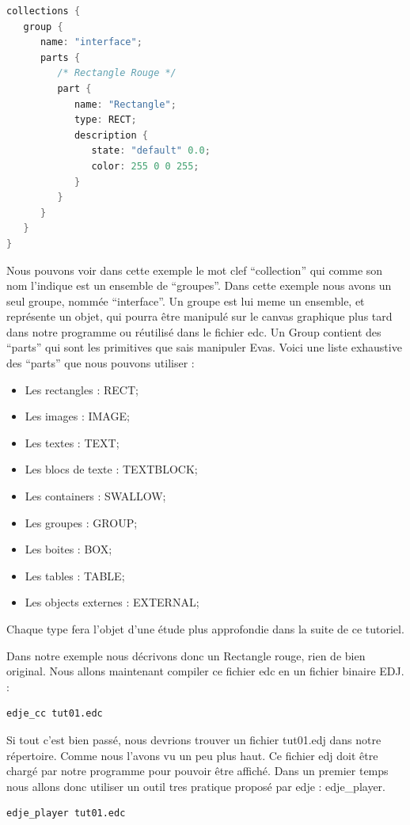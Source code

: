 \documentclass[a4paper]{efr}
\begin{document}
\begin{lstlisting}[language=c]
 collections {
   group {
      name: "interface";
      parts {
         /* Rectangle Rouge */
         part {
            name: "Rectangle";
            type: RECT;
            description {
               state: "default" 0.0;
               color: 255 0 0 255;
            }
         }
      }
   }
}
\end{lstlisting}

Nous pouvons voir dans cette exemple le mot clef ``collection'' qui comme son
nom l'indique est un ensemble de ``groupes''.
Dans cette exemple nous avons un seul groupe, nommée ``interface''.
Un groupe est lui meme un ensemble, et représente un objet, qui pourra être
manipulé sur le canvas graphique plus tard dans notre programme ou réutilisé
dans le fichier edc.
Un Group contient des ``parts'' qui sont les primitives que sais manipuler Evas.
Voici une liste exhaustive des ``parts'' que nous pouvons utiliser :
\begin{itemize}
\item Les rectangles : RECT;
\item Les images : IMAGE;
\item Les textes : TEXT;
\item Les blocs de texte : TEXTBLOCK;
\item Les containers : SWALLOW;
\item Les groupes : GROUP;
\item Les boites : BOX;
\item Les tables : TABLE;
\item Les objects externes : EXTERNAL;
\end{itemize}
Chaque type fera l'objet d'une étude plus approfondie dans la suite de ce
tutoriel.

Dans notre exemple nous décrivons donc un Rectangle rouge, rien de bien
original. Nous allons maintenant compiler ce fichier edc en un fichier binaire
EDJ.  :

\begin{lstlisting}
edje_cc tut01.edc
\end{lstlisting}

Si tout c'est bien passé, nous devrions trouver un fichier tut01.edj dans notre
répertoire. Comme nous l'avons vu un peu plus haut. Ce fichier edj doit être
chargé par notre programme pour pouvoir être affiché. Dans un premier temps nous
allons donc utiliser un outil tres pratique proposé par edje : edje\_player.

\begin{lstlisting}
edje_player tut01.edc
\end{lstlisting}
\end{document}
